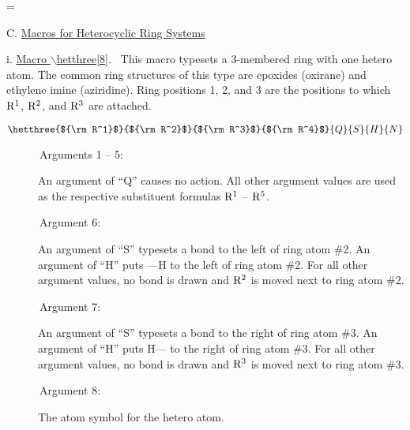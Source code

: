 
  \nofiles                          
  \def\LATEX{\LaTeX}
  \let\TEX = \TeX               
  \setcounter{totalnumber}{5}   
  \setcounter{topnumber}{3}     
  \setcounter{bottomnumber}{3}
  \setlength{\oddsidemargin}{3.9cm}     %
  \setlength{\textwidth}{5.7in}         %
  \setlength{\topmargin}{1cm}
  \setlength{\headheight}{.6cm}
  \setlength{\textheight}{8.5in}
  \setlength{\parindent}{1cm}
  \renewcommand{\baselinestretch}{1.5}
  \raggedbottom
  \setlength{\itemsep}{-2mm}
  
  
  
  
      
  \setcounter{page}{62}
  \setcounter{chapter}{6}
  =\tenrm
  \initial
 \newcommand{\ri}{All other argument values cause no action}
 \newcommand{\rhq}{An argument of ``Q'' causes no action. \ }

 \noindent C. \underline{Macros for Heterocyclic Ring Systems}

 \vspace{\len mm}
 \indent i. \underline{Macro $\backslash $hetthree[8]}.
 \ This macro typesets a 3-membered ring with one hetero atom.
 The common ring structures of this type are epoxides (oxirane)
 and ethylene imine (aziridine). Ring positions 1, 2, and 3 are
 the positions to which ${\rm R^1}$, ${\rm R^2}$, and ${\rm R^3}$   
 are attached.

 \[ \hetthree{${\rm R^1}$}{${\rm R^2}$}{${\rm R^3}$}{${\rm R^4}$}
               {Q}{S}{H}{N}  \]
 
 \begin{description}
 \item[{\rm \ \ \ \ \ \ Arguments 1 -- 5:}] An argument of ``Q''
      causes no action. All other argument values are used as 
      the respective substituent formulas ${\rm R^1}$ -- ${\rm R^5}$.
 \item[{\rm \ \ \ \ \ \ Argument 6:}] An argument of ``S'' typesets
      a bond to the left of ring atom \#2. An argument of ``H''
      puts ---H to the left of ring atom \#2. For all other
      argument values, no bond is drawn and ${\rm R^2}$ is moved
      next to ring atom \#2.
 \item[{\rm \ \ \ \ \ \ Argument 7:}] An argument of ``S'' typesets
      a bond to the right of ring atom \#3. An argument of ``H''
      puts H--- to the right of ring atom \#3. For all other
      argument values, no bond is drawn and ${\rm R^3}$ is
      moved next to ring atom \#3.
 \item[{\rm \ \ \ \ \ \ Argument 8:}] The atom symbol for the
      hetero atom.
 \end{description}

